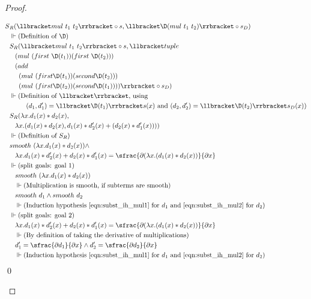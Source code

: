 \begin{proof}
\begin{enumerate}
      \begin{align*}
        S&_R(\llbracket mul\ t_1\ t_2 \rrbracket \circ s, \llbracket \D(mul\ t_1\ t_2) \rrbracket \circ s_D) \\
        &\Vdash \text{(Definition of $\D$)}\\
        &S_R(\llbracket mul\ t_1\ t_2 \rrbracket \circ s, \llbracket tuple\ \\
        & \;\;\;(mul\ (first\ \D(t_1)) (first\ \D(t_2)))\ \\
        & \;\;\;(add\ \\
        & \;\;\;\;\;(mul\ (first \D(t_1)) (second \D(t_2))) \\
        & \;\;\;\;\;(mul\ (first \D(t_2)) (second \D(t_1)))) \rrbracket \circ s_D) \\
        &\Vdash \text{(Definition of $\llbracket\rrbracket$, using} \\
        & \;\;\;\;\;\;\;\;\; \text{$(d_1, d_1') = \llbracket \D(t_1) \rrbracket s(x)$ and $(d_2, d_2') = \llbracket \D(t_2) \rrbracket s_D(x)$)}\\
        &S_R(\lambda x. d_1(x) * d_2(x), \\
        & \;\;\; \lambda x. (d_1(x) * d_2(x), d_1(x) * d_2'(x) + (d_2(x) * d_1'(x)))) \\
        &\Vdash \text{(Definition of $S_R$)}\\
        &smooth\ (\lambda x. d_1(x) * d_2(x)) \wedge \\
        & \;\;\; \lambda x. d_1(x) * d_2'(x) + d_2(x) * d_1'(x) = \sfrac{\partial{(\lambda x. (d_1(x) * d_2(x))}}{\partial{x}} \\
        &\Vdash \text{(split goals: goal 1)}\\
        &\;\;\;smooth\ (\lambda x. d_1(x) * d_2(x)) \\
        &\;\;\;\Vdash
          \text{(Multiplication is smooth, if subterms are smooth)}\\
        &\;\;\;smooth\ d_1 \wedge smooth\ d_2 \\
        &\;\;\;\Vdash \text{(Induction hypothesis \ref{eqn:subst_ih_mul1} for $d_1$ and \ref{eqn:subst_ih_mul2} for $d_2$)}\\
        &\Vdash \text{(split goals: goal 2)}\\
        &\;\;\;\lambda x. d_1(x) * d_2'(x) + d_2(x) * d_1'(x) = \sfrac{\partial{(\lambda x. (d_1(x) * d_2(x))}}{\partial{x}} \\
        &\;\;\;\Vdash \text{(By definition of taking the derivative of multiplications)} \\
        &\;\;\; d_1' = \sfrac{\partial{d_1}}{\partial{x}} \wedge d_2' = \sfrac{\partial{d_2}}{\partial{x}} \\
        &\;\;\;\Vdash \text{(Induction hypothesis \ref{eqn:subst_ih_mul1} for $d_1$ and \ref{eqn:subst_ih_mul2} for $d_2$)}\\
      \end{align*} \qed


\end{enumerate}
\end{proof}
